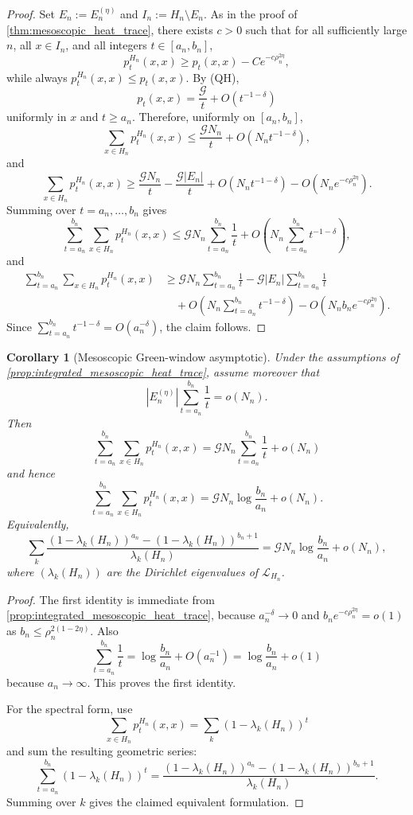 \documentclass[reqno]{amsart}
\numberwithin{equation}{section}
\newtheorem{corollary}[corollary]{Corollary}
\theoremstyle{definition}
\theoremstyle{remark}
\newcommand{\Cref}[1]{\autoref{#1}}
\newcommand{\cG}{\mathcal{G}}
\newcommand{\LL}{\mathcal{L}}
\begin{document}
\begin{proof}
Set $E_n:=E_n^{(\eta)}$ and $I_n:=H_n\setminus E_n$. As in the proof of \Cref{thm:mesoscopic_heat_trace}, there exists $c>0$ such that for all sufficiently large $n$, all $x\in I_n$, and all integers $t\in[a_n,b_n]$,
\[
  p_t^{H_n}(x,x)\ge p_t(x,x)-C e^{-c\rho_n^{2\eta}},
\]
while always $p_t^{H_n}(x,x)\le p_t(x,x)$. By \textup{(QH)},
\[
  p_t(x,x)=\frac{\cG}{t}+O(t^{-1-\delta})
\]
uniformly in $x$ and $t\ge a_n$. Therefore, uniformly on $[a_n,b_n]$,
\[
  \sum_{x\in H_n} p_t^{H_n}(x,x)
  \le
  \frac{\cG N_n}{t}+O(N_n t^{-1-\delta}),
\]
and
\[
  \sum_{x\in H_n} p_t^{H_n}(x,x)
  \ge
  \frac{\cG N_n}{t}
  - \frac{\cG |E_n|}{t}
  + O(N_n t^{-1-\delta})
  - O(N_n e^{-c\rho_n^{2\eta}}).
\]
Summing over $t=a_n,\dots,b_n$ gives
\[
  \sum_{t=a_n}^{b_n}\sum_{x\in H_n} p_t^{H_n}(x,x)
  \le
  \cG N_n\sum_{t=a_n}^{b_n}\frac1t
  + O\!\left(N_n\sum_{t=a_n}^{b_n} t^{-1-\delta}\right),
\]
and
\begin{align*}
  \sum_{t=a_n}^{b_n}\sum_{x\in H_n} p_t^{H_n}(x,x)
  &\ge
  \cG N_n\sum_{t=a_n}^{b_n}\frac1t
  - \cG |E_n|\sum_{t=a_n}^{b_n}\frac1t \\
  &\quad
  + O\!\left(N_n\sum_{t=a_n}^{b_n} t^{-1-\delta}\right)
  - O\!\left(N_n b_n e^{-c\rho_n^{2\eta}}\right).
\end{align*}
Since $\sum_{t=a_n}^{b_n} t^{-1-\delta}=O(a_n^{-\delta})$, the claim follows.
\end{proof}

\begin{corollary}[Mesoscopic Green-window asymptotic]\label{cor:mesoscopic_green_window}
Under the assumptions of \Cref{prop:integrated_mesoscopic_heat_trace}, assume moreover that
\[
  |E_n^{(\eta)}|\sum_{t=a_n}^{b_n}\frac1t=o(N_n).
\]
Then
\[
  \sum_{t=a_n}^{b_n}\sum_{x\in H_n} p_t^{H_n}(x,x)
  =
  \cG N_n\sum_{t=a_n}^{b_n}\frac1t+o(N_n)
\]
and hence
\[
  \sum_{t=a_n}^{b_n}\sum_{x\in H_n} p_t^{H_n}(x,x)
  =
  \cG N_n \log\frac{b_n}{a_n}+o(N_n).
\]
Equivalently,
\[
  \sum_k
  \frac{(1-\lambda_k(H_n))^{a_n}-(1-\lambda_k(H_n))^{b_n+1}}
       {\lambda_k(H_n)}
  =
  \cG N_n \log\frac{b_n}{a_n}+o(N_n),
\]
where $(\lambda_k(H_n))$ are the Dirichlet eigenvalues of $\LL_{H_n}$.
\end{corollary}

\begin{proof}
The first identity is immediate from \Cref{prop:integrated_mesoscopic_heat_trace}, because $a_n^{-\delta}\to0$ and $b_n e^{-c\rho_n^{2\eta}}=o(1)$ as $b_n\le \rho_n^{2(1-2\eta)}$. Also
\[
  \sum_{t=a_n}^{b_n}\frac1t
  =
  \log\frac{b_n}{a_n}+O(a_n^{-1})
  =
  \log\frac{b_n}{a_n}+o(1)
\]
because $a_n\to\infty$. This proves the first identity.

For the spectral form, use
\[
  \sum_{x\in H_n} p_t^{H_n}(x,x)=\sum_k (1-\lambda_k(H_n))^t
\]
and sum the resulting geometric series:
\[
  \sum_{t=a_n}^{b_n}(1-\lambda_k(H_n))^t
  =
  \frac{(1-\lambda_k(H_n))^{a_n}-(1-\lambda_k(H_n))^{b_n+1}}
       {\lambda_k(H_n)}.
\]
Summing over $k$ gives the claimed equivalent formulation.
\end{proof}
\end{document}
